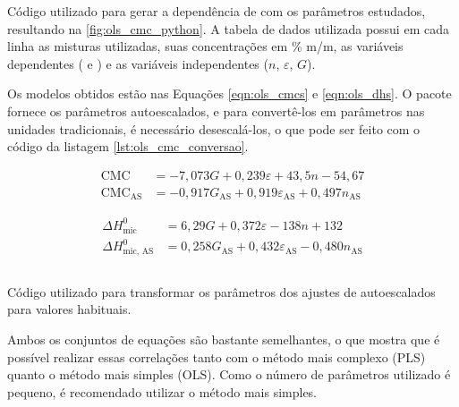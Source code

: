 		\begin{listing}[h]
			\inputminted{python}{./python/ols_cmc_statsmodels.py}
			\caption{Código utilizado para gerar a dependência de \cmc{} com os parâmetros estudados, resultando na \autoref{fig:ols_cmc_python}. A tabela de dados utilizada possui em cada linha as misturas utilizadas, suas concentrações em \% m/m, as variáveis dependentes (\cmc{} e \DHmic) e as variáveis independentes (\(n\), \(\varepsilon\), \(G\)).}
			\label{lst:ols_cmc_python}
		\end{listing}
		
		Os modelos obtidos estão nas Equações \ref{eqn:ols_cmcs} e \ref{eqn:ols_dhs}. O pacote fornece os parâmetros autoescalados, e para convertê-los em parâmetros nas unidades tradicionais, é necessário desescalá-los, o que pode ser feito com o código da listagem \ref{lst:ols_cmc_conversao}.
		
		\begin{subequations}
			\begin{align}
			\textrm{CMC}               & = -7{,}073G              + 0{,}239\varepsilon             + 43{,}5n              -54{,}67  \label{eqn:ols_cmc}     \\
			\textrm{CMC}_{\textrm{AS}} & = -0{,}917G_\textrm{AS}  + 0{,}919\varepsilon_\textrm{AS} +0{,}497n_\textrm{AS}          \label{eqn:ols_cmc_AS}
			\end{align}
			\label{eqn:ols_cmcs}
		\end{subequations}
		
		\begin{subequations}
			\begin{align}
			\Delta H_\textrm{mic}^0     & = 6{,}29G              + 0{,}372\varepsilon             - 138n               + 132  \label{eqn:ols_dh} \\
			\Delta H_\textrm{mic, AS}^0 & = 0{,}258G_\textrm{AS} + 0{,}432\varepsilon_\textrm{AS} - 0{,}480n_\textrm{AS}        \label{eqn:ols_dh_AS}
			\end{align}
			\label{eqn:ols_dhs}
		\end{subequations}
		
		\begin{listing}[h]
			\inputminted{python}{./python/ols_cmc_conversão.py}
			\caption{Código utilizado para transformar os parâmetros dos ajustes de autoescalados para valores habituais.}
			\label{lst:ols_cmc_conversao}
		\end{listing}
		
		Ambos os conjuntos de equações são bastante semelhantes, o que mostra que é possível realizar essas correlações tanto com o método mais complexo (PLS) quanto o método mais simples (OLS). Como o número de parâmetros utilizado é pequeno, é recomendado utilizar o método mais simples. %
		
